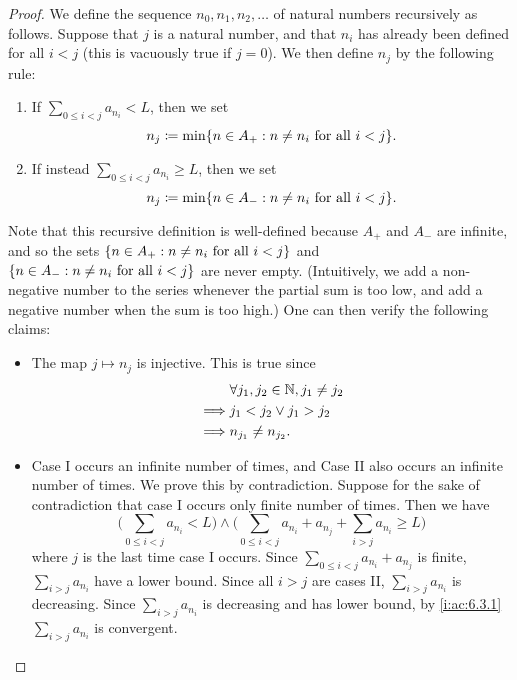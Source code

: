 \begin{proof}
  We define the sequence \(n_0, n_1, n_2, \dots\) of natural numbers recursively as follows.
  Suppose that \(j\) is a natural number, and that \(n_i\) has already been defined for all \(i < j\) (this is vacuously true if \(j = 0\)).
  We then define \(n_j\) by the following rule:
  \begin{enumerate}[label=(\Roman*)]
    \item If \(\sum_{0 \leq i < j} a_{n_i} < L\), then we set
          \[
            n_j \coloneqq \min\set{n \in A_+ : n \neq n_i \text{ for all } i < j}.
          \]
    \item If instead \(\sum_{0 \leq i < j} a_{n_i} \geq L\), then we set
          \[
            n_j \coloneqq \min\set{n \in A_- : n \neq n_i \text{ for all } i < j}.
          \]
  \end{enumerate}
  Note that this recursive definition is well-defined because \(A_+\) and \(A_-\) are infinite, and so the sets \(\left\lbrace n \in A_+ : n \neq n_i \text{ for all } i < j\right\rbrace\) and \(\left\lbrace n \in A_- : n \neq n_i \text{ for all } i < j\right\rbrace\) are never empty.
  (Intuitively, we add a non-negative number to the series whenever the partial sum is too low, and add a negative number when the sum is too high.)
  One can then verify the following claims:
  \begin{itemize}
    \item The map \(j \mapsto n_j\) is injective.
          This is true since
          \begin{align*}
                     & \forall j_1, j_2 \in \mathbb{N}, j_1 \neq j_2 \\
            \implies & j_1 < j_2 \lor j_1 > j_2              \\
            \implies & n_{j_1} \neq n_{j_2}.
          \end{align*}
    \item Case I occurs an infinite number of times, and Case II also occurs an infinite number of times.
          We prove this by contradiction.
          Suppose for the sake of contradiction that case I occurs only finite number of times.
          Then we have
          \[
            \Bigg(\sum_{0 \leq i < j} a_{n_i} < L\Bigg) \land \Bigg(\sum_{0 \leq i < j} a_{n_i} + a_{n_j} + \sum_{i > j} a_{n_i} \geq L\Bigg)
          \]
          where \(j\) is the last time case I occurs.
          Since \(\sum_{0 \leq i < j} a_{n_i} + a_{n_j}\) is finite, \(\sum_{i > j} a_{n_i}\) have a lower bound.
          Since all \(i > j\) are cases II, \(\sum_{i > j} a_{n_i}\) is decreasing.
          Since \(\sum_{i > j} a_{n_i}\) is decreasing and has lower bound, by \cref{i:ac:6.3.1} \(\sum_{i > j} a_{n_i}\) is convergent.

\end{itemize}
\end{proof}
